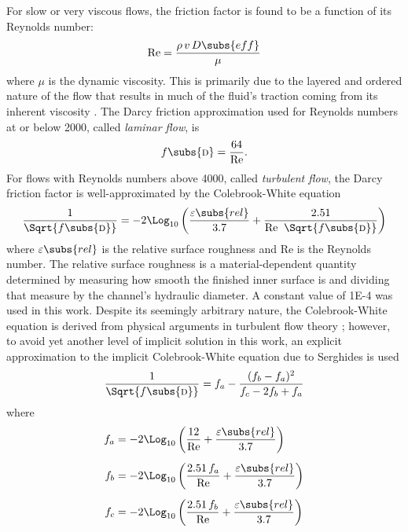 For slow or very viscous flows, the friction factor is found to be a function of its Reynolds number:
\begin{equation}
    \text{Re} = \frac{\rho\,v\,D\subs{eff}}{\mu}
\end{equation}
where $\mu$ is the dynamic viscosity.
This is primarily due to the layered and ordered nature of the flow that results in much of the fluid's traction coming from its inherent viscosity \cite{nellis_heat_2009}.
The Darcy friction approximation used for Reynolds numbers at or below \num{2000}, called \textit{laminar flow}, is 
\begin{equation}
    f\subs{\textsc{d}} = \frac{64}{\text{Re}}.
\end{equation}
For flows with Reynolds numbers above \num{4000}, called \textit{turbulent flow}, the Darcy friction factor is well-approximated by the Colebrook-White equation
\begin{equation}
    \frac{1}{\Sqrt{f\subs{\textsc{d}}}} = -2 \Log_{10}\left(\frac{\varepsilon\subs{rel}}{3.7} + \frac{2.51}{\text{Re}\;\;\Sqrt{f\subs{\textsc{d}}}}\right)
\end{equation}
where $\varepsilon\subs{rel}$ is the relative surface roughness and $\text{Re}$ is the Reynolds number.
The relative surface roughness is a material-dependent quantity determined by measuring how smooth the finished inner surface is and dividing that measure by the channel's hydraulic diameter.
A constant value of \num{1E-4} was used in this work.
Despite its seemingly arbitrary nature, the Colebrook-White equation is derived from physical arguments in turbulent flow theory \cite{matthew_colebrook-white_1990}; however, to avoid yet another level of implicit solution in this work, an explicit approximation to the implicit Colebrook-White equation due to Serghides is used
\begin{equation}
    \frac{1}{\Sqrt{f\subs{\textsc{d}}}} = f_a - \frac{(f_b - f_a)^2}{f_c - 2 f_b + f_a}
\end{equation}
where
\begin{subequations}
    \begin{align}
        f_a &= -2 \Log_{10}\left( \frac{12}       {\text{Re}} + \frac{\varepsilon\subs{rel}}{3.7}\right) \\[0.5em]
        f_b &= -2 \Log_{10}\left( \frac{2.51\,f_a}{\text{Re}} + \frac{\varepsilon\subs{rel}}{3.7}\right)\\[0.5em]
        f_c &= -2 \Log_{10}\left( \frac{2.51\,f_b}{\text{Re}} + \frac{\varepsilon\subs{rel}}{3.7}\right)
    \end{align}
\end{subequations}

